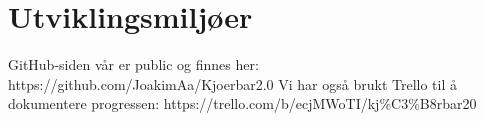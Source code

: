 \section{Utviklingsmiljøer}
GitHub-siden vår er public og finnes her: https://github.com/JoakimAa/Kjoerbar2.0
Vi har også brukt Trello til å dokumentere progressen: https://trello.com/b/ecjMWoTI/kj\%C3\%B8rbar20